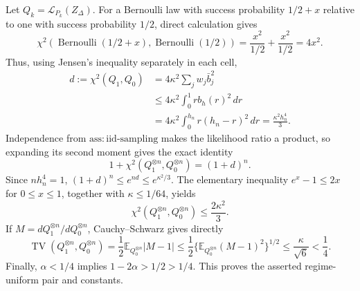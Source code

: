 Let \(Q_k=\mathcal L_{P_k}(Z_\Delta)\).  For a Bernoulli law with success probability \(1/2+x\) relative to one with success probability \(1/2\), direct calculation gives
\[
 \chi^2\!\left(\operatorname{Bernoulli}(1/2+x),
 \operatorname{Bernoulli}(1/2)\right)
 =\frac{x^2}{1/2}+\frac{x^2}{1/2}=4x^2.
\]
Thus, using Jensen's inequality separately in each cell,
\[
 \begin{aligned}
 d:=\chi^2(Q_1,Q_0)
 &=4\kappa^2\sum_j w_j\bar b_j^2\\
 &\le4\kappa^2\int_0^1r b_h(r)^2\,dr\\
 &=4\kappa^2\int_0^{h_n}r(h_n-r)^2\,dr
 =\frac{\kappa^2h_n^4}{3}.
 \end{aligned}
\]
Independence from \(\mathrm{ass:iid\text{-}sampling}\) makes the likelihood ratio a product, so expanding its second moment gives the exact identity
\[
 1+\chi^2(Q_1^{\otimes n},Q_0^{\otimes n})=(1+d)^n.
\]
Since \(nh_n^4=1\), \((1+d)^n\le e^{nd}\le e^{\kappa^2/3}\).  The elementary inequality \(e^x-1\le2x\) for \(0\le x\le1\), together with \(\kappa\le1/64\), yields
\[
 \chi^2(Q_1^{\otimes n},Q_0^{\otimes n})\le\frac{2\kappa^2}{3}.
\]
If \(M=dQ_1^{\otimes n}/dQ_0^{\otimes n}\), Cauchy--Schwarz gives directly
\[
 \operatorname{TV}(Q_1^{\otimes n},Q_0^{\otimes n})
 =\frac12\mathbb E_{Q_0^{\otimes n}}|M-1|
 \le\frac12\{\mathbb E_{Q_0^{\otimes n}}(M-1)^2\}^{1/2}
 \le\frac{\kappa}{\sqrt6}<\frac14.
\]
Finally, \(\alpha<1/4\) implies \(1-2\alpha>1/2>1/4\).  This proves the asserted regime-uniform pair and constants.